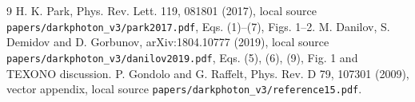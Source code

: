 \begin{thebibliography}{9}
 H. K. Park, Phys. Rev. Lett. 119, 081801 (2017), local source \texttt{papers/darkphoton\_v3/park2017.pdf}, Eqs. (1)--(7), Figs. 1--2.
 M. Danilov, S. Demidov and D. Gorbunov, arXiv:1804.10777 (2019), local source \texttt{papers/darkphoton\_v3/danilov2019.pdf}, Eqs. (5), (6), (9), Fig. 1 and TEXONO discussion.
 P. Gondolo and G. Raffelt, Phys. Rev. D 79, 107301 (2009), vector appendix, local source \texttt{papers/darkphoton\_v3/reference15.pdf}.
\end{thebibliography}
